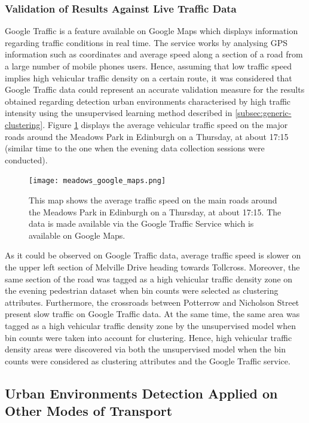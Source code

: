\documentclass[bsc,frontabs,twoside,singlespacing, parskip,deptreport]{infthesis}     %
\begin{document}
\subsubsection*{Validation of Results Against Live Traffic Data}

Google Traffic is a feature available on Google Maps which displays information regarding traffic conditions in real time. The service works by analysing GPS information such as coordinates and average speed along a section of a road from a large number of mobile phones users. Hence, assuming that low traffic speed implies high vehicular traffic density on a certain route, it was considered that Google Traffic data could represent an accurate validation measure for the results obtained regarding detection urban environments characterised by high traffic intensity using the unsupervised learning method described in \ref{subsec:generic-clustering}. Figure \ref{fig:meadows-google-maps} displays the average vehicular traffic speed on the major roads around the Meadows Park in Edinburgh on a Thursday, at about 17:15 (similar time to the one when the evening data collection sessions were conducted).

\begin{figure}[h!]
  \center
  \texttt{[image: meadows\_google\_maps.png]}
  \caption{This map shows the average traffic speed on the main roads around the Meadows Park in Edinburgh on a Thursday, at about 17:15. The data is made available via the Google Traffic Service which is available on Google Maps.}
  \label{fig:meadows-google-maps}
\end{figure}

As it could be observed on Google Traffic data, average traffic speed is slower on the upper left section of Melville Drive heading towards Tollcross. Moreover, the same section of the road was tagged as a high vehicular traffic density zone on the evening pedestrian dataset when bin counts were selected as clustering attributes. Furthermore, the crossroads between Potterrow and Nicholson Street present slow traffic on Google Traffic data. At the same time, the same area was tagged as a high vehicular traffic density zone by the unsupervised model when bin counts were taken into account for clustering. Hence, high vehicular traffic density areas were discovered via both the unsupervised model when the bin counts were considered as clustering attributes and the Google Traffic service.


\subsection{Urban Environments Detection Applied on Other Modes of Transport}
\label{subsec:urban-envs-on-modes-of-transport}
\end{document}
